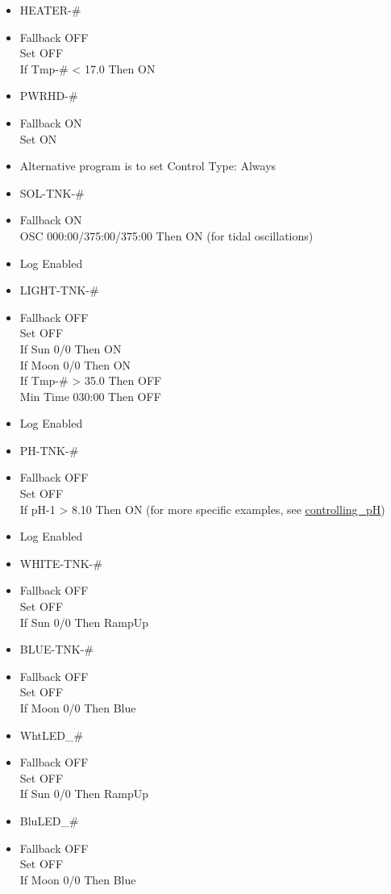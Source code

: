 \documentclass[]{book}
\providecommand{\tightlist}{%
  \setlength{\itemsep}{0pt}\setlength{\parskip}{0pt}}
\begin{document}
\begin{itemize}
\tightlist
\item
  HEATER-\#
\item
  Fallback OFF\\
  Set OFF\\
  If Tmp-\# \textless{} 17.0 Then ON\\
\item
  PWRHD-\#
\item
  Fallback ON\\
  Set ON\\
\item
  Alternative program is to set Control Type: Always\\
\item
  SOL-TNK-\#
\item
  Fallback ON\\
  OSC 000:00/375:00/375:00 Then ON (for tidal oscillations)\\
\item
  Log Enabled\\
\item
  LIGHT-TNK-\#
\item
  Fallback OFF\\
  Set OFF\\
  If Sun 0/0 Then ON\\
  If Moon 0/0 Then ON\\
  If Tmp-\# \textgreater{} 35.0 Then OFF\\
  Min Time 030:00 Then OFF\\
\item
  Log Enabled\\
\item
  PH-TNK-\#
\item
  Fallback OFF\\
  Set OFF\\
  If pH-1 \textgreater{} 8.10 Then ON (for more specific examples, see
  \protect\hyperlink{controlling_pH}{controlling\_pH})\\
\item
  Log Enabled\\
\item
  WHITE-TNK-\#
\item
  Fallback OFF\\
  Set OFF\\
  If Sun 0/0 Then RampUp\\
\item
  BLUE-TNK-\#
\item
  Fallback OFF\\
  Set OFF\\
  If Moon 0/0 Then Blue\\
\item
  WhtLED\_\#
\item
  Fallback OFF\\
  Set OFF\\
  If Sun 0/0 Then RampUp\\
\item
  BluLED\_\#
\item
  Fallback OFF\\
  Set OFF\\
  If Moon 0/0 Then Blue
\end{itemize}
\end{document}
